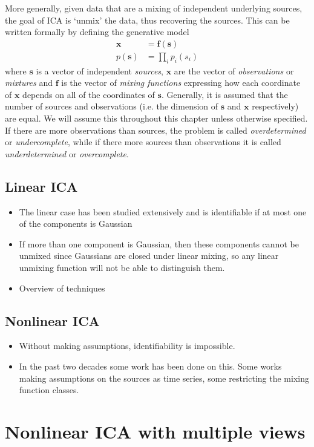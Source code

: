 More generally, given data that are a mixing of independent underlying sources, the goal of ICA is `unmix' the data, thus recovering the sources.
This can be written formally by defining the generative model
\begin{align*}
\bm{x} &= \bm{f}(\bm{s}) \\
p(\bm{s}) &= \prod_{i} p_i(s_i)
\end{align*}
where $\bm{s}$ is a vector of independent \emph{sources}, $\bm{x}$ are the vector of \emph{observations} or \emph{mixtures} and $\bm{f}$ is the vector of \emph{mixing functions} expressing how each coordinate of $\bm{x}$ depends on all of the coordinates of $\bm{s}$. 
Generally, it is assumed that the number of sources and observations (i.e. the dimension of $\bm{s}$ and $\bm{x}$ respectively) are equal. We will assume this throughout this chapter unless otherwise specified. 
If there are more observations than sources, the problem is called \emph{overdetermined} or \emph{undercomplete}, while if there more sources than observations it is called \emph{underdetermined} or \emph{overcomplete}.



\subsection{Linear ICA}

\begin{itemize}
	\item The linear case has been studied extensively and is identifiable if at most one of the components is Gaussian
	\item If more than one component is Gaussian, then these components cannot be unmixed since Gaussians are closed under linear mixing, so any linear unmixing function will not be able to distinguish them.
	\item Overview of techniques
\end{itemize}

\subsection{Nonlinear ICA}

\begin{itemize}
	\item Without making assumptions, identifiability is impossible.
	\item In the past two decades some work has been done on this. Some works making assumptions on the sources as time series, some restricting the mixing function classes.
\end{itemize}

\section{Nonlinear ICA with multiple views}
